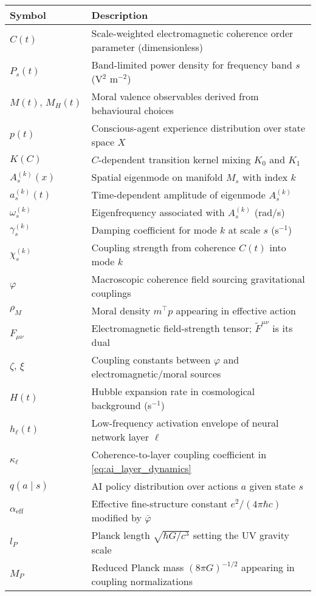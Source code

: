 \documentclass[12pt,a4paper]{article}
\theoremstyle{definition}
\begin{document}
\begin{center}
\begin{tabular}{ll}
\hline
Symbol & Description \\
\hline
$C(t)$ & Scale-weighted electromagnetic coherence order parameter (dimensionless) \\
$P_s(t)$ & Band-limited power density for frequency band $s$ (V$^2$ m$^{-2}$) \\
$M(t),\, M_H(t)$ & Moral valence observables derived from behavioural choices \\
$p(t)$ & Conscious-agent experience distribution over state space $X$ \\
$K(C)$ & $C$-dependent transition kernel mixing $K_0$ and $K_1$ \\
$A_s^{(k)}(x)$ & Spatial eigenmode on manifold $M_s$ with index $k$ \\
$a_s^{(k)}(t)$ & Time-dependent amplitude of eigenmode $A_s^{(k)}$ \\
$\omega_s^{(k)}$ & Eigenfrequency associated with $A_s^{(k)}$ (rad/s) \\
$\gamma_s^{(k)}$ & Damping coefficient for mode $k$ at scale $s$ (s$^{-1}$) \\
$\chi_s^{(k)}$ & Coupling strength from coherence $C(t)$ into mode $k$ \\
$\varphi$ & Macroscopic coherence field sourcing gravitational couplings \\
$\rho_M$ & Moral density $m^\top p$ appearing in effective action \\
$F_{\mu\nu}$ & Electromagnetic field-strength tensor; $\tilde{F}^{\mu\nu}$ is its dual \\
$\zeta,\, \xi$ & Coupling constants between $\varphi$ and electromagnetic/moral sources \\
$H(t)$ & Hubble expansion rate in cosmological background (s$^{-1}$) \\
$h_\ell(t)$ & Low-frequency activation envelope of neural network layer $\ell$ \\
$\kappa_\ell$ & Coherence-to-layer coupling coefficient in \eqref{eq:ai_layer_dynamics} \\
$q(a \mid s)$ & AI policy distribution over actions $a$ given state $s$ \\
$\alpha_{\text{eff}}$ & Effective fine-structure constant $e^2/(4\pi\hbar c)$ modified by $\bar{\varphi}$ \\
$l_P$ & Planck length $\sqrt{\hbar G/c^3}$ setting the UV gravity scale \\
$M_P$ & Reduced Planck mass $(8\pi G)^{-1/2}$ appearing in coupling normalizations \\

\end{tabular}
\end{center}
\end{document}
